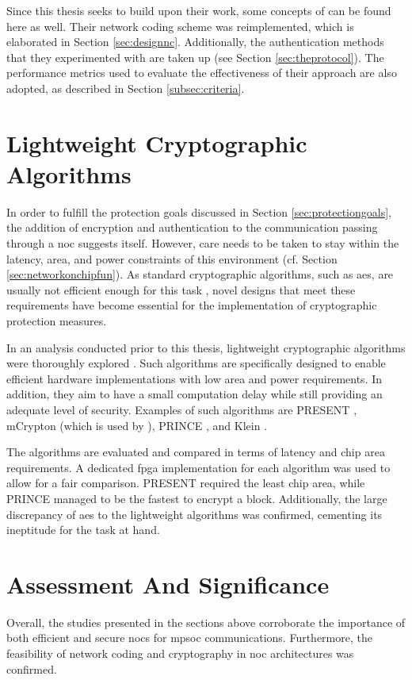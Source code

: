 Since this thesis seeks to build upon their work, some concepts of \citeauthor{moriam18activeattackers} can be found here as well. Their network coding
scheme was reimplemented, which is elaborated in Section \ref{sec:designnc}. Additionally, the authentication methods that they experimented with
are taken up (see Section \ref{sec:theprotocol}). The performance metrics used to evaluate the effectiveness of their approach are also adopted, as
described in Section \ref{subsec:criteria}.

\section{Lightweight Cryptographic Algorithms}\label{sec:lightweightcrypto}
In order to fulfill the protection goals discussed in Section \ref{sec:protectiongoals}, the addition of encryption and authentication to
the communication passing through a \gls{noc} suggests itself. However, care needs to be taken to stay within the latency, area, and power constraints
of this environment (cf. Section \ref{sec:networkonchipfun}). As standard cryptographic algorithms, such as \gls{aes}, are usually not efficient
enough for this task \cite[1]{bogdanov07present}, novel designs that meet these requirements have become essential for the implementation of
cryptographic protection measures.

In an analysis conducted prior to this thesis, lightweight cryptographic algorithms were thoroughly explored \cite{harttung17lightweightcrypto}. Such
algorithms are
specifically designed to enable efficient hardware implementations with low area and power requirements. In addition, they aim to have a small
computation delay while still providing an adequate level of security. Examples of such algorithms are PRESENT \cite{bogdanov07present},
mCrypton \cite{lim06mcrypton} (which is used by \citeauthor{moriam18activeattackers} \cite[3]{moriam18activeattackers}), PRINCE \cite{borghoff12prince},
and Klein \cite{gong12klein}.

The algorithms are evaluated and compared in terms of latency and chip area requirements. A dedicated \gls{fpga} implementation for each algorithm
was used to allow for a fair comparison. PRESENT required the least chip area, while PRINCE managed to be the fastest to encrypt a block.
Additionally, the large discrepancy of \gls{aes} to the lightweight algorithms was confirmed, cementing its ineptitude for the task at hand.

\section{Assessment And Significance}\label{sec:assandsig}
Overall, the studies presented in the sections above corroborate the importance of both efficient and secure \glspl{noc} for \gls{mpsoc}
communications. Furthermore, the feasibility of network coding and cryptography in \gls{noc} architectures was confirmed.

